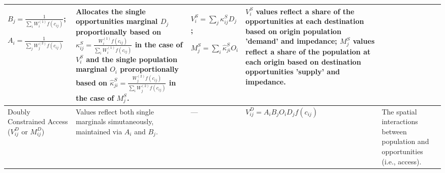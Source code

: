 {\begin{longtable}{|p{2.5cm}|p{2.5cm}|p{2.5cm}|p{3cm}|p{3cm}|}
$B_j = \frac{1}{\sum_i W_i^{(1)} f(c_{ij})}$;

$A_i = \frac{1}{\sum_j W_j^{(2)} f(c_{ij})}$

& Allocates the single opportunities marginal $D_j$ proportionally based on $\kappa^S_{ij} =  \frac{W_i^{(1)} f(c_{ij})}{\sum_i W_i^{(1)} f(c_{ij})}$ in the case of $V_i^S$ and the single population marginal $O_i$ proroportionally based on $\hat \kappa^S_{ji} = \frac{W_j^{(2)} f(c_{ij})}{\sum_i W_j^{(2)} f(c_{ij})}$ in the case of $M_j^S$.

& $V^S_i = \sum_j \kappa^S_{ij} D_j$;

$M_j^S =  \sum_i \hat \kappa^S_{ji} O_i$

& $V^S_i$ values reflect a share of the opportunities at each destination based on origin population 'demand' and impedance; $M^S_j$ values reflect a share of the population at each origin based on destination opportunities 'supply' and impedance.\\
\hline

Doubly Constrained Access ($V_{ij}^D$ or $M_{ij}^D$)
& Values reflect both single marginals simutaneously, maintained via $A_i$ and $B_j$.
& —
& $V_{ij}^D = A_i B_j O_i D_j f(c_{ij})$
& The spatial interactions between population and opportunities (i.e., access). \\
\hline

\end{longtable}
}
